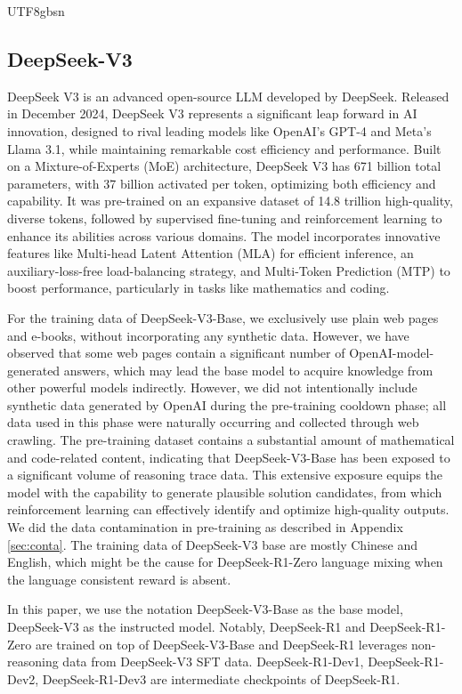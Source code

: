 \documentclass[11pt, a4paper, logo, copyright, nonumbering]{deepseek}
\newcommand{\dsviii}{DeepSeek-V3}
\newcommand{\dsri}{DeepSeek-R1}
\newcommand{\dsro}{DeepSeek-R1-Zero}
\begin{document}
\begin{CJK*}{UTF8}{gbsn}
\subsection{DeepSeek-V3} \label{sec: background_v3}
DeepSeek V3 \citep{dsviii} is an advanced open-source  LLM developed by DeepSeek. Released in December 2024, DeepSeek V3 represents a significant leap forward in AI innovation, designed to rival leading models like OpenAI's GPT-4 and Meta's Llama 3.1, while maintaining remarkable cost efficiency and performance.
Built on a Mixture-of-Experts (MoE) architecture, DeepSeek V3 has 671 billion total parameters, with 37 billion activated per token, optimizing both efficiency and capability. It was pre-trained on an expansive dataset of 14.8 trillion high-quality, diverse tokens, followed by supervised fine-tuning and reinforcement learning to enhance its abilities across various domains. The model incorporates innovative features like Multi-head Latent Attention (MLA) \citep{dsvii} for efficient inference, an auxiliary-loss-free load-balancing strategy, and Multi-Token Prediction (MTP) \citep{meta_mtp} to boost performance, particularly in tasks like mathematics and coding.

For the training data of \dsviii{}-Base, we exclusively use plain web pages and e-books, without incorporating any synthetic data. However, we have observed that some web pages contain a significant number of OpenAI-model-generated answers, which may lead the base model to acquire knowledge from other powerful models indirectly. However, we did not intentionally include synthetic data generated by OpenAI during the pre-training cooldown phase; all data used in this phase were naturally occurring and collected through web crawling. The pre-training dataset contains a substantial amount of mathematical and code-related content, indicating that \dsviii{}-Base has been exposed to a significant volume of reasoning trace data. This extensive exposure equips the model with the capability to generate plausible solution candidates, from which reinforcement learning can effectively identify and optimize high-quality outputs.
We did the data contamination in pre-training as described in Appendix \ref{sec:conta}. The training data of DeepSeek-V3 base are mostly Chinese and English, which might be the cause for DeepSeek-R1-Zero language mixing when the language consistent reward is absent. 

In this paper, we use the notation DeepSeek-V3-Base as the base model, DeepSeek-V3 as the instructed model. Notably, \dsri{} and \dsro{} are trained on top of DeepSeek-V3-Base and  \dsri{} leverages non-reasoning data from DeepSeek-V3 SFT data. DeepSeek-R1-Dev1, DeepSeek-R1-Dev2, DeepSeek-R1-Dev3 are  intermediate checkpoints of \dsri{}. 


\end{CJK*}
\end{document}
